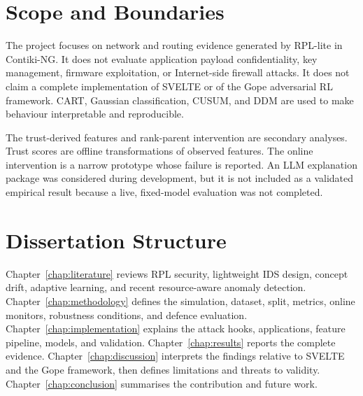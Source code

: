 \section{Scope and Boundaries}

The project focuses on network and routing evidence generated by RPL-lite in Contiki-NG. It does not evaluate application payload confidentiality, key management, firmware exploitation, or Internet-side firewall attacks. It does not claim a complete implementation of SVELTE or of the Gope adversarial RL framework. CART, Gaussian classification, CUSUM, and DDM are used to make behaviour interpretable and reproducible.

The trust-derived features and rank-parent intervention are secondary analyses. Trust scores are offline transformations of observed features. The online intervention is a narrow prototype whose failure is reported. An LLM explanation package was considered during development, but it is not included as a validated empirical result because a live, fixed-model evaluation was not completed.

\section{Dissertation Structure}

Chapter~\ref{chap:literature} reviews RPL security, lightweight IDS design, concept drift, adaptive learning, and recent resource-aware anomaly detection. Chapter~\ref{chap:methodology} defines the simulation, dataset, split, metrics, online monitors, robustness conditions, and defence evaluation. Chapter~\ref{chap:implementation} explains the attack hooks, applications, feature pipeline, models, and validation. Chapter~\ref{chap:results} reports the complete evidence. Chapter~\ref{chap:discussion} interprets the findings relative to SVELTE and the Gope framework, then defines limitations and threats to validity. Chapter~\ref{chap:conclusion} summarises the contribution and future work.
